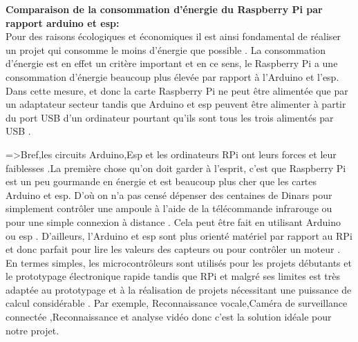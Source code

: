 \textbf{Comparaison de la consommation d'énergie du Raspberry Pi par rapport arduino et esp:}\\
\vspace{10pt}
\newline
Pour des raisons écologiques et économiques il est ainsi fondamental de réaliser un projet qui consomme le moins d'énergie que possible . La
consommation d'énergie est en effet un critère important et en ce sens, le Raspberry Pi a une consommation d'énergie beaucoup plus élevée par rapport à l'Arduino et l'esp.  Dans cette mesure, et donc la carte Raspberry Pi ne peut être alimentée que par un adaptateur secteur tandis que Arduino et esp  peuvent être  alimenter à partir du port USB d'un ordinateur pourtant qu'ils sont tous les trois alimentés par USB .
\vspace{15pt}
\newline
 
 =>Bref,les circuits Arduino,Esp et les ordinateurs RPi ont leurs forces et leur faiblesses .La première chose qu'on doit garder à l'esprit, c'est que Raspberry Pi est un peu gourmande en énergie et est beaucoup plus cher que les cartes Arduino et esp. D'où on n'a pas censé dépenser des centaines de Dinars pour simplement contrôler une ampoule à l'aide de la télécommande infrarouge ou pour une simple connexion à distance . Cela peut être fait en utilisant Arduino ou esp . D'ailleurs, l'Arduino et esp sont plus orienté matériel par rapport au RPi et donc parfait pour lire les valeurs des capteurs ou pour contrôler un moteur .\\
 En termes simples, les microcontrôleurs sont utilisés pour les projets débutants et  le prototypage électronique rapide tandis que RPi et malgré ses limites est très adaptée au prototypage et à la réalisation de projets nécessitant une puissance de calcul considérable . Par exemple,   Reconnaissance vocale,Caméra de surveillance connectée ,Reconnaissance et analyse vidéo donc c'est la solution idéale pour notre projet.
